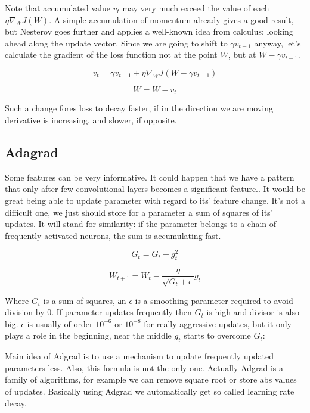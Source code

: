Note that accumulated value $v_t$ may very much exceed the value of each $\eta\nabla_W J(W)$. A simple accumulation of momentum already gives a good result, but Nesterov goes further and applies a well-known idea from calculus: looking ahead along the update vector. Since we are going to shift to $\gamma v_{t-1}$ anyway, let's calculate the gradient of the loss function not at the point $W$, but at $W - \gamma v_{t-1}$.

\begin{equation}
    v_t = \gamma v_{t-1} + \eta \nabla_W J( W - \gamma v_{t-1} )
\end{equation}

\begin{equation}
    W = W - v_t
\end{equation}

Such a change fores loss to decay faster, if in the direction we are moving derivative is increasing, and slower, if opposite.

\subsection{Adagrad}

Some features can be very informative. It could happen that we have a pattern that only after few convolutional layers becomes a significant feature.. It would be great being able to update parameter with regard to its' feature change. It's not a difficult one, we just should store for a parameter a sum of squares of its' updates. It will stand for similarity: if the parameter belongs to a chain of frequently activated neurons, the sum is accumulating fast.

\begin{equation}
    G_{t} = G_{t} + g_{t}^2
\end{equation}

\begin{equation}
    W_{t+1} = W_{t} - \frac{\eta}{\sqrt{G_{t} + \epsilon}} g_{t}
\end{equation}

Where $G_{t}$ is a sum of squares, аn $\epsilon$ is a smoothing parameter required to avoid division by $0$. If parameter updates frequently then $G_t$ is high and divisor is also big. $\epsilon$ is usually of order $10^{-6}$ or $10^{-8}$ for really aggressive updates, but it only plays a role in the beginning, near the middle $g_t$ starts to overcome $G_t$:

Main idea of Adgrad is to use a mechanism to update frequently updated parameters less. Also, this formula is not the only one. Actually Adgrad is a family of algorithms, for example we can remove square root or store abs values of updates. Basically using Adgrad we automatically get so called learning rate decay.

